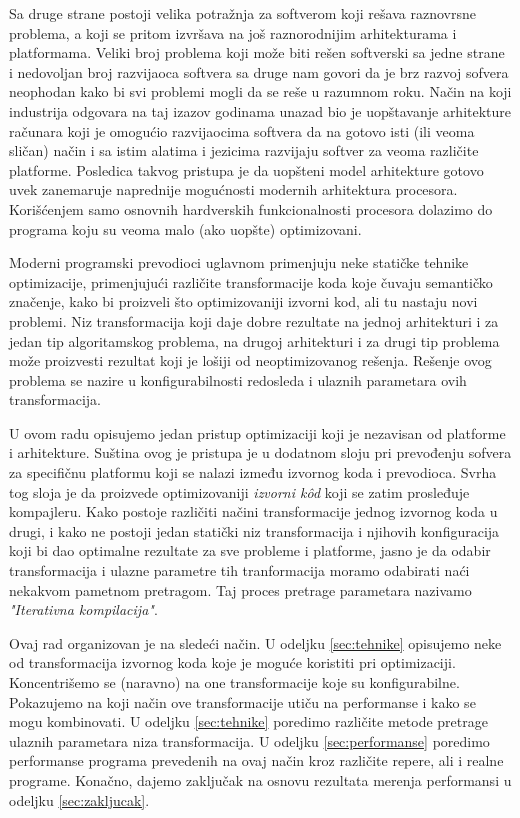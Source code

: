 \documentclass[a4paper]{article}
\begin{document}
{\par
Sa druge strane postoji velika potražnja za softverom koji rešava raznovrsne problema, a koji se pritom izvršava na još raznorodnijim arhitekturama i platformama.
Veliki broj problema koji može biti rešen softverski sa jedne strane i nedovoljan broj razvijaoca softvera sa druge nam govori da je brz razvoj sofvera neophodan kako bi svi problemi 
mogli da se reše u razumnom roku. Način na koji industrija odgovara na taj izazov godinama unazad bio je uopštavanje arhitekture računara koji je omogućio razvijaocima softvera 
da na gotovo isti (ili veoma sličan) način i sa istim alatima i jezicima razvijaju softver za veoma različite platforme. Posledica takvog pristupa je da uopšteni model arhitekture gotovo uvek zanemaruje 
naprednije mogućnosti modernih arhitektura procesora. Korišćenjem samo osnovnih hardverskih funkcionalnosti procesora dolazimo do programa koju su veoma malo (ako uopšte) optimizovani.

\par 
Moderni programski prevodioci uglavnom primenjuju neke statičke tehnike optimizacije, primenjujući različite transformacije koda koje čuvaju semantičko značenje, kako bi proizveli što optimizovaniji izvorni kod, ali tu nastaju novi problemi. 
Niz transformacija koji daje dobre rezultate na jednoj arhitekturi i za jedan tip algoritamskog problema, na drugoj arhitekturi i za drugi tip problema može proizvesti rezultat koji je lošiji od neoptimizovanog rešenja.
Rešenje ovog problema se nazire u konfigurabilnosti redosleda i ulaznih parametara ovih transformacija.
\par
U ovom radu opisujemo jedan pristup optimizaciji koji je nezavisan od platforme i arhitekture. Suština ovog je pristupa je u dodatnom sloju pri prevođenju 
sofvera za specifičnu platformu koji se nalazi između izvornog koda i prevodioca. Svrha tog sloja je da proizvede optimizovaniji \emph{izvorni k\^{o}d} koji se zatim prosleđuje 
kompajleru. Kako postoje različiti načini transformacije jednog izvornog koda u drugi, i kako ne postoji jedan statički niz transformacija i njihovih konfiguracija koji bi dao optimalne rezultate za sve probleme i platforme, 
jasno je da odabir transformacija i ulazne parametre tih tranformacija moramo odabirati naći nekakvom pametnom pretragom. Taj proces pretrage parametara nazivamo \emph{"Iterativna kompilacija"}.
\par
Ovaj rad organizovan je na sledeći način. 
U odeljku \ref{sec:tehnike} opisujemo neke od transformacija izvornog koda koje je moguće koristiti pri optimizaciji. 
Koncentrišemo se (naravno) na one transformacije koje su konfigurabilne. Pokazujemo na koji način ove transformacije utiču na performanse i kako se mogu kombinovati. 
U odeljku \ref{sec:tehnike} poredimo različite metode pretrage ulaznih parametara niza transformacija.
U odeljku \ref{sec:performanse} poredimo performanse programa prevedenih na ovaj način kroz različite repere, ali i realne programe.
Konačno, dajemo zaključak na osnovu rezultata merenja performansi u odeljku \ref{sec:zakljucak}.


}
\end{document}
